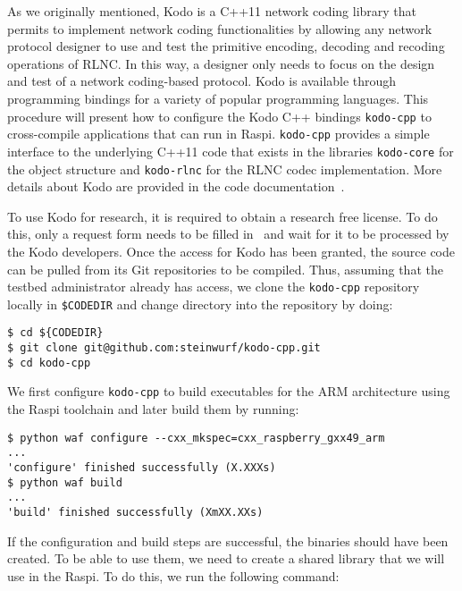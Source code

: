 As we originally mentioned, Kodo is a C++11 network coding library that
permits to implement network coding functionalities by allowing any network
protocol designer to use and test the primitive encoding, decoding and
recoding operations of \ac{RLNC}. In this way, a designer only needs to
focus on the design and test of a network coding-based protocol. Kodo is
available through programming bindings for a variety of popular
programming languages. This procedure will present how to configure the
Kodo C++ bindings \texttt{kodo-cpp} to cross-compile applications that can
run in \ac{Raspi}. \texttt{kodo-cpp} provides a simple interface to the
underlying C++11 code that exists in the libraries \texttt{kodo-core} for
the object structure and \texttt{kodo-rlnc} for the \ac{RLNC} codec
implementation. More details about Kodo are provided in the code
documentation~\cite{kodocppdoc}.

To use Kodo for research, it is required to obtain a research free license.
To do this, only a request form needs to be filled
in~\cite{steinwurflicenselink} and wait for it to be processed by the Kodo
developers. Once
the access for Kodo has been granted, the source code can be pulled from
its Git repositories to be compiled. Thus, assuming that the testbed
administrator already has access, we clone the \texttt{kodo-cpp}
repository locally in \texttt{\${CODEDIR}} and change directory into
the repository by doing:

\begin{lstlisting}[]
$ cd ${CODEDIR}
$ git clone git@github.com:steinwurf/kodo-cpp.git
$ cd kodo-cpp
\end{lstlisting}
\FloatBarrier
\vspace{-5mm}

We first configure \texttt{kodo-cpp} to build executables for the
\ac{ARM} architecture using the \ac{Raspi} toolchain and later build them
by running:
\begin{lstlisting}[]
$ python waf configure --cxx_mkspec=cxx_raspberry_gxx49_arm
...
'configure' finished successfully (X.XXXs)
$ python waf build
...
'build' finished successfully (XmXX.XXs)
\end{lstlisting}
\FloatBarrier
\vspace{-5mm}

If the configuration and build steps are successful, the binaries should
have been created. To be able to use them, we need to create a shared library
that we will use in the \ac{Raspi}. To do this, we run the following command:

